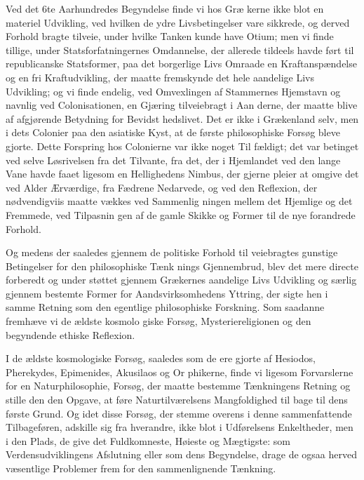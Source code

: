 \documentclass[12pt,a4paper]{book}
\begin{document}
Ved det 6te Aarhundredes Begyndelse finde vi hos Græ\-%
kerne ikke blot en materiel Udvikling, ved hvilken de ydre
Livsbetingelser vare sikkrede, og derved Forhold bragte tilveie,
under hvilke Tanken kunde have Otium; men vi finde tillige,
under Statsforfatningernes Omdannelse, der allerede tildeels
havde ført til republicanske Statsformer, paa det borgerlige
Livs Omraade en Kraftanspændelse og en fri Kraftudvikling,
der maatte fremskynde det hele aandelige Livs Udvikling; og
vi finde endelig, ved Omvexlingen af Stammernes Hjemstavn
og navnlig ved Colonisationen, en Gjæring tilveiebragt i Aan\-%
derne, der maatte blive af afgjørende Betydning for Bevidst\-%
hedslivet. Det er ikke i Grækenland selv, men i dets Colonier
paa den asiatiske Kyst, at de første philosophiske Forsøg bleve
gjorte. Dette Forspring hos Colonierne var ikke noget Til\-%
fældigt; det var betinget ved selve Løsrivelsen fra det Tilvante,
fra det, der i Hjemlandet ved den lange Vane havde faaet
ligesom en Hellighedens Nimbus, der gjerne pleier at omgive
det ved Alder Ærværdige, fra Fædrene Nedarvede, og ved den
Reflexion, der nødvendigviis maatte vækkes ved Sammenlig\-%
ningen mellem det Hjemlige og det Fremmede, ved Tilpasnin\-%
gen af de gamle Skikke og Former til de nye forandrede
Forhold.

Og medens der saaledes gjennem de politiske Forhold til\-%
veiebragtes gunstige Betingelser for den philosophiske Tænk\-%
nings Gjennembrud, blev det mere directe forberedt og under\-%
støttet gjennem Grækernes aandelige Livs Udvikling og særlig
gjennem bestemte Former for Aandsvirksomhedens Yttring,
der sigte hen i samme Retning som den egentlige philosophiske
Forskning. Som saadanne fremhæve vi de ældste kosmolo\-%
giske Forsøg, Mysteriereligionen og den begyndende ethiske
Reflexion.

I de ældste kosmologiske Forsøg, saaledes som de ere
gjorte af Hesiodos, Pherekydes, Epimenides, Akusilaos og Or\-%
phikerne, finde vi ligesom Forvarslerne for en Naturphilosophie,
Forsøg, der maatte bestemme Tænkningens Retning og stille
den den Opgave, at føre Naturtilværelsens Mangfoldighed til\-%
bage til dens første Grund. Og idet disse Forsøg, der stemme
overens i denne sammenfattende Tilbageføren, adskille sig fra
hverandre, ikke blot i Udførelsens Enkeltheder, men i den
Plads, de give det Fuldkomneste, Høieste og Mægtigste: som
Verdensudviklingens Afslutning eller som dens Begyndelse,
drage de ogsaa herved væsentlige Problemer frem for den
sammenlignende Tænkning.
\end{document}
